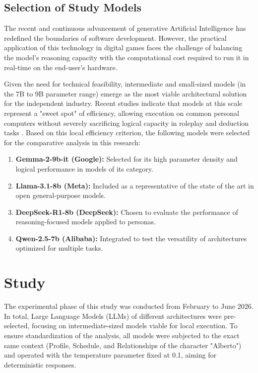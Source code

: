 \documentclass[12pt]{article}
\begin{document}
\subsection{Selection of Study Models}

The recent and continuous advancement of generative Artificial Intelligence has redefined the boundaries of software development. However, the practical application of this technology in digital games faces the challenge of balancing the model's reasoning capacity with the computational cost required to run it in real-time on the end-user's hardware.

Given the need for technical feasibility, intermediate and small-sized models (in the 7B to 9B parameter range) emerge as the most viable architectural solution for the independent industry. Recent studies indicate that models at this scale represent a "sweet spot" of efficiency, allowing execution on common personal computers without severely sacrificing logical capacity in roleplay and deduction tasks \cite{cao2026task}. Based on this local efficiency criterion, the following models were selected for the comparative analysis in this research:

\begin{enumerate}
    \item \textbf{Gemma-2-9b-it (Google):} Selected for its high parameter density and logical performance in models of its category.
    \item \textbf{Llama-3.1-8b (Meta):} Included as a representative of the state of the art in open general-purpose models.
    \item \textbf{DeepSeek-R1-8b (DeepSeek):} Chosen to evaluate the performance of reasoning-focused models applied to personas.
    \item \textbf{Qwen-2.5-7b (Alibaba):} Integrated to test the versatility of architectures optimized for multiple tasks.
\end{enumerate}

\section{Study}

The experimental phase of this study was conducted from February to June 2026. In total, Large Language Models (LLMs) of different architectures were pre-selected, focusing on intermediate-sized models viable for local execution. To ensure standardization of the analysis, all models were subjected to the exact same context (Profile, Schedule, and Relationships of the character "Alberto") and operated with the temperature parameter fixed at 0.1, aiming for deterministic responses.
\end{document}
